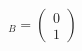 \documentclass[preview]{standalone}
\begin{document}
\begin{align*}
[v]_B = \begin{pmatrix} 0 \\ 1 \end{pmatrix}
\end{align*}
\end{document}
